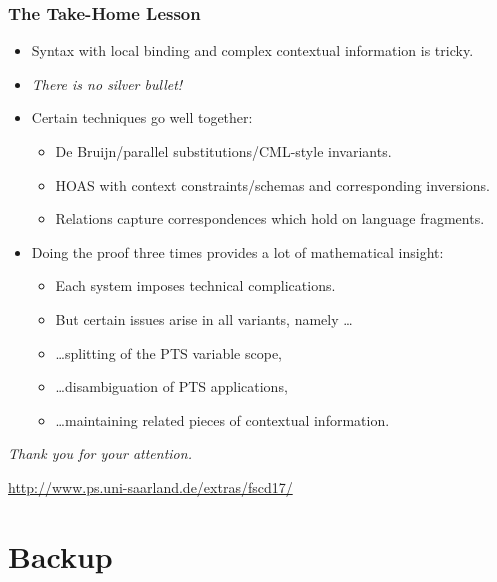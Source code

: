 \documentclass[english,pdftex,dvipsnames,leqno,handout]{beamer}%
\newcommand{\hl}[1]{\emph{\color{sbmcyan} #1}}
\begin{document}
\begin{frame}
  \frametitle{The Take-Home Lesson}
  \pause
  \begin{itemize}
  \item Syntax with local binding and complex contextual information is tricky.
  \item \hl{There is no silver bullet!}\pause
  \item Certain techniques go well together:
    \begin{itemize}
    \item De Bruijn/parallel substitutions/CML-style invariants.
    \item HOAS with context constraints/schemas and corresponding inversions.
    \item Relations capture correspondences which hold on language fragments.
    \end{itemize}\pause
  \item Doing the proof three times provides a lot of mathematical insight:
    \begin{itemize}
    \item Each system imposes technical complications.
    \item But certain issues arise in all variants, namely \ldots
    \item \ldots splitting of the PTS variable scope,
    \item \ldots disambiguation of PTS applications,
    \item \ldots maintaining related pieces of contextual information.
    \end{itemize}
  \end{itemize}
\end{frame}

\begin{frame}
  \begin{center}
    \begin{Large}
      \hl{Thank you for your attention.}
    \end{Large}
    \vfill
    \url{http://www.ps.uni-saarland.de/extras/fscd17/}
  \end{center}
\end{frame}


\section*{Backup}
\end{document}
